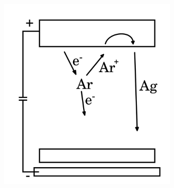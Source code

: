 
\begin{figure}[tbh]
    \centering
    \begin{subfigure}[t]{.3\textwidth}
        \includegraphics[width=\textwidth]{./Pics/sputter1.png}
        \caption{}
        \label{fig:sputter0}
    \end{subfigure}
    \hspace{1cm}
    \begin{subfigure}[t]{.3\textwidth}

\end{subfigure}
\end{figure}
